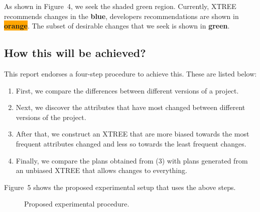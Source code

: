 \documentclass[sigconf, proceedings, 9pt]{acmart}
\begin{document}
As shown in Figure~4, we seek the shaded green region. Currently, XTREE 
recommends changes in the \colorbox{steel}{{\color{white}\textbf{blue}}}, 
developers recommendations are shown in 
\colorbox{orange}{{\color{white}\textbf{orange}}}. The subset of desirable 
changes that we seek is shown in \colorbox{Code}{{\color{white}\textbf{green}}}.

\subsection{How this will be achieved?}

This report endorses a four-step procedure to achieve this. These are listed 
below:
\begin{enumerate}
	\item First, we compare the differences between different versions of a 
	project.
	\item Next, we discover the attributes that have most changed between 
	different versions of the project.
	\item After that, we construct an XTREE that are more biased towards the most 
	frequent attributes changed and less so towards the least frequent changes.
	\item Finally, we compare the plans obtained from (3) with plans generated 
	from an unbiased XTREE that allows changes to	everything.
\end{enumerate}

\noindent Figure~5 shows the proposed experimental setup that uses the above 
steps.

\begin{figure}[t!]
\centering
{}
\caption{Proposed experimental procedure.}
\end{figure}

\balance


\end{document}
